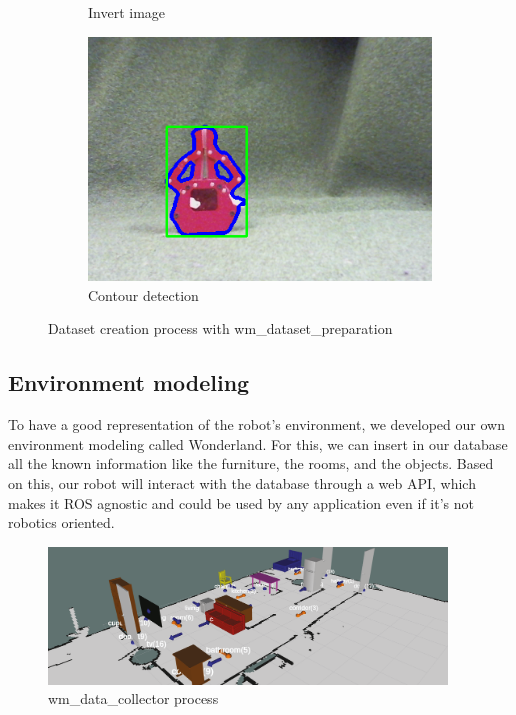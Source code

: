 \documentclass[runningheads,a4paper]{llncs}
\begin{document}
\begin{figure}[h!]
\begin{subfigure}[b]{0.3\linewidth}
    \caption{Invert image}
  \end{subfigure}
  \begin{subfigure}[b]{0.3\linewidth}
    \includegraphics[width=\linewidth]{images/bounding_contours.png}
    \caption{Contour detection}
  \end{subfigure}
  \caption{Dataset creation process with wm\_dataset\_preparation}
  \label{fig:coffee}
\end{figure}  
 
\subsection{Environment modeling}
\tab To have a good representation of the robot's environment, we developed our own environment modeling called Wonderland. For this, we can insert in our database all the known information like the furniture, the rooms, and the objects. Based on this, our robot will interact with the database through a web API, which makes it ROS agnostic and could be used by any application even if it's not robotics oriented.\\

\begin{figure}
  \centering
  \includegraphics[width=300pt]{images/wonderland.png}
  \caption{ wm\_data\_collector process}
\end{figure} 
\end{document}
